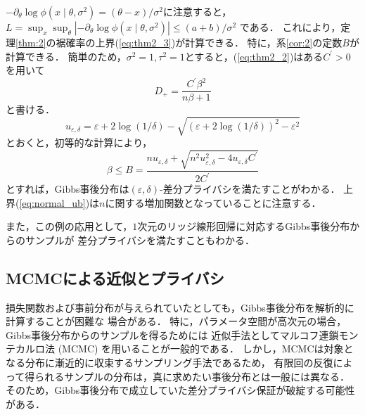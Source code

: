\documentclass{jarticle}
\theoremstyle{definition}
\begin{document}
$-\partial_\theta \log \phi (x \mid \theta, \sigma^2) = (\theta - x)/\sigma^2$に注意すると，
$L=\sup_{x}\sup_{\theta}|-\partial_\theta \log \phi (x \mid \theta, \sigma^2)| \leq (a + b)/\sigma^2$
である．
これにより，定理\ref{thm:2}の裾確率の上界(\ref{eq:thm2_3})が計算できる．
特に，系\ref{cor:2}の定数$B$が計算できる．
簡単のため，$\sigma^2=1, \tau^2=1$とすると，(\ref{eq:thm2_2})はある$C^\prime>0$を用いて
\begin{equation}
D_+ = \frac{C^\prime \beta^2}{n\beta + 1}
\end{equation}
と書ける．
\begin{equation}
u_{\varepsilon, \delta} = \varepsilon + 2\log(1/\delta) - \sqrt{(\varepsilon + 2\log(1/\delta))^2 - \varepsilon^2}
\end{equation}
とおくと，初等的な計算により，
\begin{equation}
\beta \leq B = \frac{nu_{\varepsilon, \delta} + \sqrt{n^2u_{\varepsilon, \delta}^2 - 4u_{\varepsilon, \delta}C^\prime}}
{2C^\prime}
\label{eq:normal_ub}
\end{equation}
とすれば，Gibbs事後分布は$(\varepsilon, \delta)$-差分プライバシを満たすことがわかる．
上界(\ref{eq:normal_ub})は$n$に関する増加関数となっていることに注意する．

また，この例の応用として，$1$次元のリッジ線形回帰に対応するGibbs事後分布からのサンプルが
差分プライバシを満たすこともわかる．

\subsection{MCMCによる近似とプライバシ}

損失関数および事前分布が与えられていたとしても，Gibbs事後分布を解析的に計算することが困難な
場合がある．
特に，パラメータ空間が高次元の場合，Gibbs事後分布からのサンプルを得るためには
近似手法としてマルコフ連鎖モンテカルロ法 (MCMC) を用いることが一般的である．
しかし，MCMCは対象となる分布に漸近的に収束するサンプリング手法であるため，
有限回の反復によって得られるサンプルの分布は，真に求めたい事後分布とは一般には異なる．
そのため，Gibbs事後分布で成立していた差分プライバシ保証が破綻する可能性がある．
\end{document}
